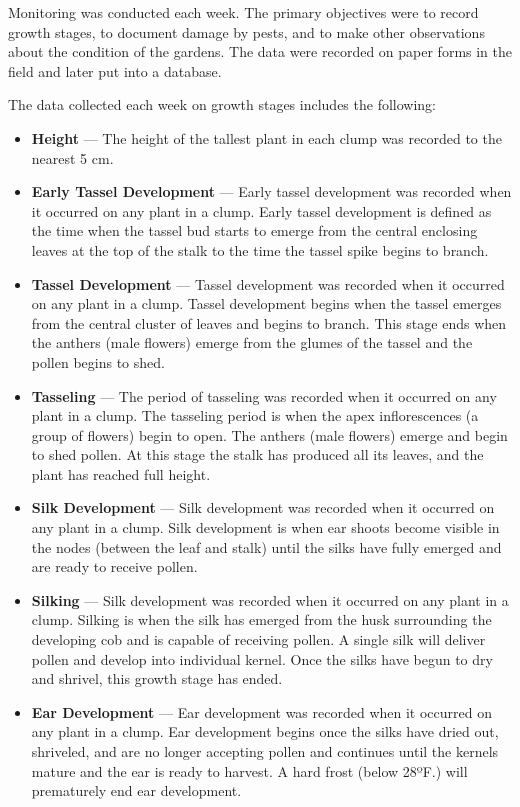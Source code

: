 \documentclass[12pt,]{article}
\providecommand{\tightlist}{%
  \setlength{\itemsep}{0pt}\setlength{\parskip}{0pt}}
\begin{document}
Monitoring was conducted each week. The primary objectives were to record growth stages, to document damage by pests, and to make other observations about the condition of the gardens. The data were recorded on paper forms in the field and later put into a database.

The data collected each week on growth stages includes the following:

\begin{itemize}
\tightlist
\item
  \textbf{Height} --- The height of the tallest plant in each clump was recorded to the nearest 5 cm.
\item
  \textbf{Early Tassel Development} --- Early tassel development was recorded when it occurred on any plant in a clump. Early tassel development is defined as the time when the tassel bud starts to emerge from the central enclosing leaves at the top of the stalk to the time the tassel spike begins to branch.
\item
  \textbf{Tassel Development} --- Tassel development was recorded when it occurred on any plant in a clump. Tassel development begins when the tassel emerges from the central cluster of leaves and begins to branch. This stage ends when the anthers (male flowers) emerge from the glumes of the tassel and the pollen begins to shed.
\item
  \textbf{Tasseling} --- The period of tasseling was recorded when it occurred on any plant in a clump. The tasseling period is when the apex inflorescences (a group of flowers) begin to open. The anthers (male flowers) emerge and begin to shed pollen. At this stage the stalk has produced all its leaves, and the plant has reached full height.
\item
  \textbf{Silk Development} --- Silk development was recorded when it occurred on any plant in a clump. Silk development is when ear shoots become visible in the nodes (between the leaf and stalk) until the silks have fully emerged and are ready to receive pollen.
\item
  \textbf{Silking} --- Silk development was recorded when it occurred on any plant in a clump. Silking is when the silk has emerged from the husk surrounding the developing cob and is capable of receiving pollen. A single silk will deliver pollen and develop into individual kernel. Once the silks have begun to dry and shrivel, this growth stage has ended.
\item
  \textbf{Ear Development} --- Ear development was recorded when it occurred on any plant in a clump. Ear development begins once the silks have dried out, shriveled, and are no longer accepting pollen and continues until the kernels mature and the ear is ready to harvest. A hard frost (below 28ºF.) will prematurely end ear development.
\end{itemize}
\end{document}
